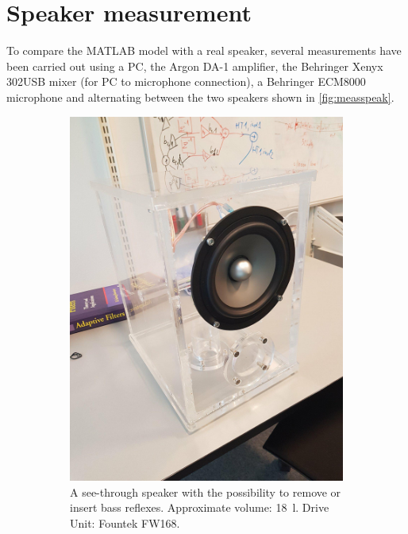 \chapter{Speaker measurement}
To compare the MATLAB model with a real speaker, several measurements have been carried out using a PC, the Argon DA-1 amplifier, the Behringer Xenyx 302USB mixer (for PC to microphone connection), a Behringer ECM8000 microphone and alternating between the two speakers shown in \cref{fig:measspeak}.

\begin{figure}
	\centering
	\begin{subfigure}{.5\textwidth}
		\centering
		\includegraphics[width=.9\linewidth, clip, trim={0 6cm 0 6cm}]{gfx/Speaker_plexi.jpg}
		\caption{A see-through speaker with the possibility to remove or insert bass reflexes. Approximate volume: \SI{18}{\litre}. Drive Unit: Fountek FW168.}
		\label{fig:measspeak1}
	\end{subfigure}%
	\begin{subfigure}{.5\textwidth}
		\centering

\end{subfigure}
\end{figure}
